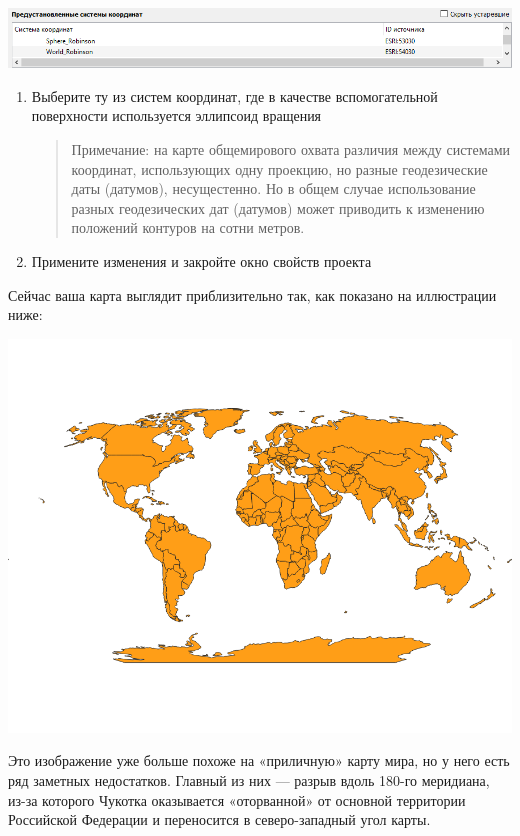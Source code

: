 \documentclass[
  12pt,
]{book}
\begin{document}
\includegraphics{images/Ex01_WorldMap/Robinson_presets.png}

\begin{enumerate}
\def\labelenumi{\arabic{enumi}.}
\setcounter{enumi}{1}
\item
  Выберите ту из систем координат, где в качестве вспомогательной поверхности используется эллипсоид вращения

  \begin{quote}
  Примечание: на карте общемирового охвата различия между системами координат, использующих одну проекцию, но разные геодезические даты (датумов), несущестенно. Но в общем случае использование разных геодезических дат (датумов) может приводить к изменению положений контуров на сотни метров.
  \end{quote}
\item
  Примените изменения и закройте окно свойств проекта
\end{enumerate}

Сейчас ваша карта выглядит приблизительно так, как показано на иллюстрации ниже:

\includegraphics{images/Ex01_WorldMap/map_robinson0.png}

Это изображение уже больше похоже на «приличную» карту мира, но у него есть ряд заметных недостатков. Главный из них --- разрыв вдоль 180-го меридиана, из-за которого Чукотка оказывается «оторванной» от основной территории Российской Федерации и переносится в северо-западный угол карты.
\end{document}
